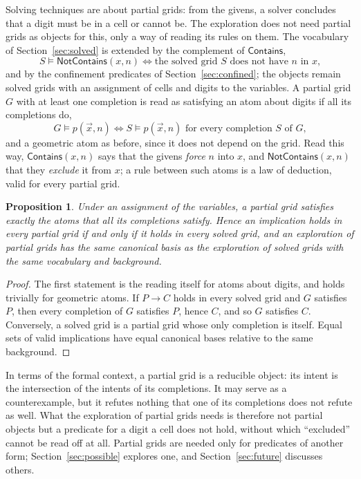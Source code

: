 \documentclass[11pt,a4paper]{article}
\newtheorem{proposition}{Proposition}
\theoremstyle{definition}
\theoremstyle{remark}
\newcommand{\pred}[1]{\mathsf{#1}}
\newcommand{\Contains}{\pred{Contains}}
\newcommand{\NotContains}{\pred{NotContains}}
\newcommand{\sat}{\models}
\begin{document}
Solving techniques are about partial grids: from the givens, a solver concludes that a digit must be in a cell or cannot be. The exploration does not need partial grids as objects for this, only a way of reading its rules on them. The vocabulary of Section~\ref{sec:solved} is extended by the complement of $\Contains$,
\[
  S \sat \NotContains(x, n) \iff \text{the solved grid $S$ does not have $n$ in $x$,}
\]
and by the confinement predicates of Section~\ref{sec:confined}; the objects remain solved grids with an assignment of cells and digits to the variables. A partial grid $G$ with at least one completion is read as satisfying an atom about digits if all its completions do,
\[
  G \sat p(\vec x, n) \iff S \sat p(\vec x, n) \text{ for every completion $S$ of $G$,}
\]
and a geometric atom as before, since it does not depend on the grid. Read this way, $\Contains(x, n)$ says that the givens \emph{force} $n$ into $x$, and $\NotContains(x, n)$ that they \emph{exclude} it from $x$; a rule between such atoms is a law of deduction, valid for every partial grid.

\begin{proposition}\label{prop:reduction}
Under an assignment of the variables, a partial grid satisfies exactly the atoms that all its completions satisfy. Hence an implication holds in every partial grid if and only if it holds in every solved grid, and an exploration of partial grids has the same canonical basis as the exploration of solved grids with the same vocabulary and background.
\end{proposition}

\begin{proof}
The first statement is the reading itself for atoms about digits, and holds trivially for geometric atoms. If $P \to C$ holds in every solved grid and $G$ satisfies $P$, then every completion of $G$ satisfies $P$, hence $C$, and so $G$ satisfies $C$. Conversely, a solved grid is a partial grid whose only completion is itself. Equal sets of valid implications have equal canonical bases relative to the same background.
\end{proof}

In terms of the formal context, a partial grid is a reducible object: its intent is the intersection of the intents of its completions. It may serve as a counterexample, but it refutes nothing that one of its completions does not refute as well. What the exploration of partial grids needs is therefore not partial objects but a predicate for a digit a cell does not hold, without which ``excluded'' cannot be read off at all. Partial grids are needed only for predicates of another form; Section~\ref{sec:possible} explores one, and Section~\ref{sec:future} discusses others.
\end{document}
